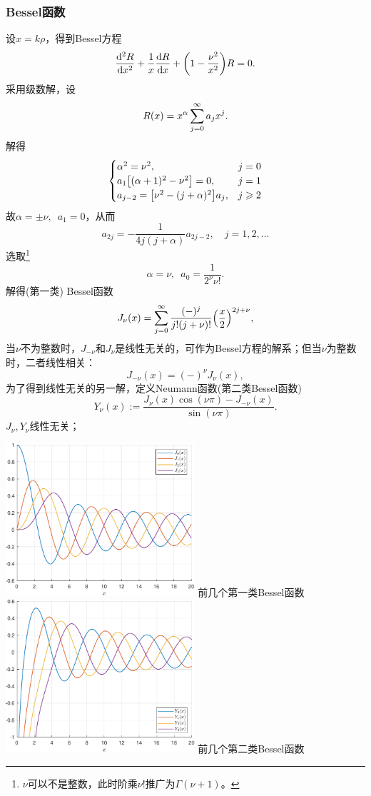 \subsubsection{Bessel函数}
设$x=k\rho$，得到Bessel方程
\begin{equation}
    \label{eqn:Bessel eqn}
    \dv[2]Rx+\frac1x\dv Rx+\biggkh{1-\frac{\nu^2}{x^2}}R=0.
\end{equation}
采用级数解，设 
\[
    R(x)=x^\alpha\sum_{j=0}^{\infty} a_jx^j.
\]
解得
\[
    \begin{cases}
        \alpha^2=\nu^2,&j=0\\
        a_1\bigl[(\alpha+1)^2-\nu^2\bigr]=0,&j=1\\
        a_{j-2}=\bigl[\nu^2-(j+\alpha)^2\bigr]a_j,&j\geqslant 2
    \end{cases}
\]
故$\alpha=\pm\nu,\enspace a_1=0$，从而
\[
    a_{2j}=-\frac1{4j(j+\alpha)}a_{2j-2},\quad j=1,2,\ldots
\]
选取\footnote{$\nu$可以不是整数，此时阶乘$\nu!$推广为$\Gamma(\nu+1)$。}
\[
    \alpha=\nu,\enspace a_0=\frac1{2^\nu\nu!}.
\]
解得(第一类) Bessel函数
\begin{equation}
    J_\nu(x)=\sum_{j=0}^{\infty}\frac{(-)^j}{j!(j+\nu)!}\Bigl(\frac x2\Bigr)^{2j+\nu},
\end{equation}
当$\nu$不为整数时，$J_{-\nu}$和$J_\nu$是线性无关的，可作为Bessel方程的解系；但当$\nu$为整数时，二者线性相关：
\[
    J_{-\nu}(x)=(-)^\nu J_\nu(x),
\]
为了得到线性无关的另一解，定义Neumann函数(第二类Bessel函数)
\begin{equation}
    Y_\nu(x):=\frac{J_\nu(x)\cos(\nu\pi)-J_{-\nu}(x)}{\sin(\nu\pi)}.
\end{equation}
$J_\nu,Y_\nu$线性无关；
\begin{center}
    \includegraphics[width=7cm]{graphs/BesselJ.pdf}
    \tikzchap 前几个第一类Bessel函数\\[1ex]
    \includegraphics[width=7cm]{graphs/BesselY.pdf}
    \tikzchap 前几个第二类Bessel函数
\end{center}
